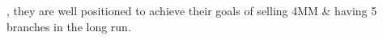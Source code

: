 , they are well positioned to achieve their goals of selling 4MM & having 5 branches in the long run.